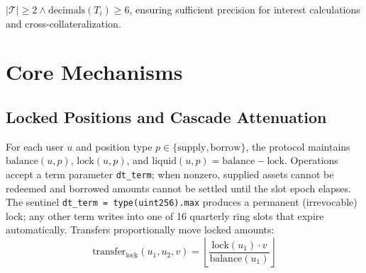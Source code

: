 \documentclass[10pt,a4paper,twocolumn]{article}
\begin{document}
\begin{definition}
\label{def:token-constraints}
$|\mathcal{T}| \geq 2 \land \text{decimals}(T_i) \geq 6$, ensuring sufficient precision for interest calculations and cross-collateralization.
\end{definition}

\section{Core Mechanisms}
\label{sec:mechanisms}

\subsection{Locked Positions and Cascade Attenuation}
\label{subsec:locked-positions}

\begin{definition}
\label{def:position-lock}
For each user $u$ and position type $p \in \{\text{supply}, \text{borrow}\}$, the protocol maintains $\text{balance}(u,p)$, $\text{lock}(u,p)$, and $\text{liquid}(u,p) = \text{balance} - \text{lock}$. Operations accept a term parameter \texttt{dt\_term}; when nonzero, supplied assets cannot be redeemed and borrowed amounts cannot be settled until the slot epoch elapses. The sentinel \texttt{dt\_term = type(uint256).max} produces a permanent (irrevocable) lock; any other term writes into one of 16 quarterly ring slots that expire automatically. Transfers proportionally move locked amounts:
\begin{equation}
\label{eq:lock-transfer}
\text{transfer}_{\text{lock}}(u_1, u_2, v) = \left\lfloor \frac{\text{lock}(u_1) \cdot v}{\text{balance}(u_1)} \right\rfloor
\end{equation}
\end{definition}
\end{document}
